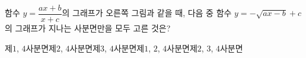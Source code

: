 \noindent\begin{minipage}[t]{0.58\linewidth}\vspace{0pt}\raggedright 함수 $y=\dfrac{ax+b}{x+c}$의 그래프가 오른쪽 그림과 같을 때, 다음 중 함수 $y=-\sqrt{ax-b}+c$의 그래프가 지나는 사분면만을 모두 고른 것은? \end{minipage}\hfill\begin{minipage}[t]{0.4\linewidth}\vspace{0pt}\centering \resizebox{\ifdim\width>\linewidth\linewidth\else\width\fi}{!}{}\end{minipage}\par
\begin{choicesii}{제$1$, $4$사분면}{제$2$, $4$사분면}{제$3$, $4$사분면}{제$1$, $2$, $4$사분면}{제$2$, $3$, $4$사분면}\end{choicesii}
